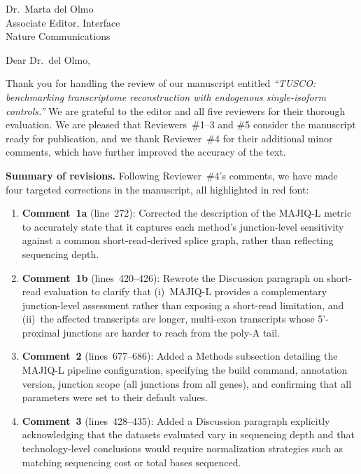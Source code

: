 \documentclass[11pt]{letter}
\date{\today}
\begin{document}
\begin{letter}{%
Dr.\ Marta del Olmo\\
Associate Editor, Interface\\
Nature Communications}

\opening{Dear Dr.\ del Olmo,}

Thank you for handling the review of our manuscript entitled
\emph{``TUSCO: benchmarking transcriptome reconstruction with endogenous single-isoform controls.''}
We are grateful to the editor and all five reviewers for their thorough
evaluation. We are pleased that Reviewers~\#1--3 and \#5 consider the
manuscript ready for publication, and we thank Reviewer~\#4 for their
additional minor comments, which have further improved the accuracy of
the text.

\bigskip
\textbf{Summary of revisions.}
Following Reviewer~\#4's comments, we have made four targeted corrections
in the manuscript, all highlighted in {\color{red}red font}:

\begin{enumerate}
  \item \textbf{Comment~1a} (line~272): Corrected the description of the
    MAJIQ-L metric to accurately state that it captures each method's
    junction-level sensitivity against a common short-read-derived splice
    graph, rather than reflecting sequencing depth.

  \item \textbf{Comment~1b} (lines~420--426): Rewrote the Discussion
    paragraph on short-read evaluation to clarify that (i)~MAJIQ-L
    provides a complementary junction-level assessment rather than
    exposing a short-read limitation, and (ii)~the affected transcripts
    are longer, multi-exon transcripts whose 5'-proximal junctions are
    harder to reach from the poly-A tail.

  \item \textbf{Comment~2} (lines~677--686): Added a Methods subsection
    detailing the MAJIQ-L pipeline configuration, specifying the build
    command, annotation version, junction scope (all junctions from all
    genes), and confirming that all parameters were set to their default
    values.

  \item \textbf{Comment~3} (lines~428--435): Added a Discussion paragraph
    explicitly acknowledging that the datasets evaluated vary in
    sequencing depth and that technology-level conclusions would require
    normalization strategies such as matching sequencing cost or total
    bases sequenced.
\end{enumerate}


\end{letter}
\end{document}
